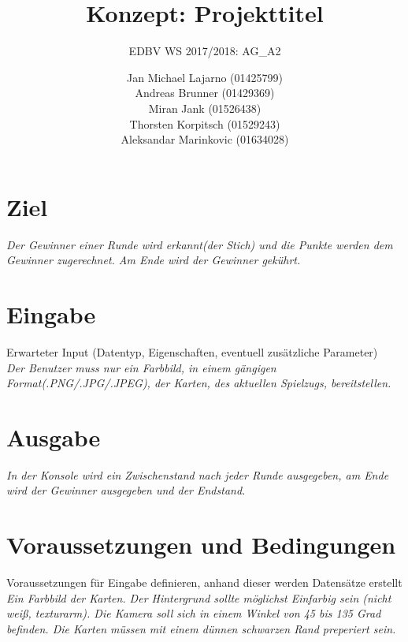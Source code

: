 \documentclass[deutsch]{scrartcl}
\begin{document}
\title{Konzept: Projekttitel} %

\subtitle{EDBV WS 2017/2018: AG\_A2} %


\author{Jan Michael Lajarno (01425799)\\
Andreas Brunner (01429369)\\
Miran Jank (01526438)\\
Thorsten Korpitsch (01529243)\\
Aleksandar Marinkovic (01634028)\\
}




\maketitle



\section{Ziel}
\textit{Der Gewinner einer Runde wird erkannt(der Stich) und die Punkte werden dem Gewinner zugerechnet. Am Ende wird der Gewinner gekührt.}
\section{Eingabe}
Erwarteter Input (Datentyp, Eigenschaften, eventuell zusätzliche Parameter)\\
\textit{Der Benutzer muss nur ein Farbbild, in einem gängigen Format(.PNG/.JPG/.JPEG), der Karten, des aktuellen Spielzugs, bereitstellen.}
\section{Ausgabe}
\textit{In der Konsole wird ein Zwischenstand nach jeder Runde ausgegeben, am Ende wird der Gewinner ausgegeben und der Endstand.}
\section{Voraussetzungen und Bedingungen}
Voraussetzungen für Eingabe definieren, anhand dieser werden Datensätze erstellt\\
\textit{Ein Farbbild der Karten. Der Hintergrund sollte möglichst Einfarbig sein (nicht weiß, texturarm). Die Kamera soll sich in einem Winkel von 45 bis 135 Grad befinden. Die Karten müssen mit einem dünnen schwarzen Rand preperiert sein.}
\end{document}
